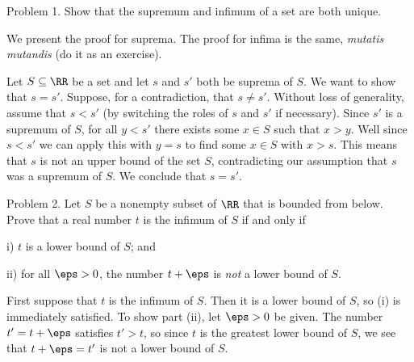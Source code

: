


\def\To{\Rightarrow}


\bigskip

\proclaim Problem 1. Show that the supremum and infimum of a set are both unique.


\proof We present the proof for suprema. The proof for infima is the same, {\it mutatis mutandis}
(do it as an exercise).

Let $S\subseteq \RR$ be a set and let $s$ and $s'$ both be suprema of $S$.
We want to show that $s = s'$.
Suppose, for a contradiction, that $s\ne s'$. Without loss of generality, assume that
$s<s'$ (by switching the roles of $s$ and $s'$ if necessary).
Since $s'$ is a supremum of $S$, for all $y < s'$ there exists some $x\in S$ such that
$x > y$. Well since $s<s'$ we can apply this with $y=s$ to find some
$x\in S$ with $x > s$. This means that $s$ is not an upper bound of the set $S$,
contradicting our assumption that $s$ was a supremum of $S$. We conclude that $s = s'$.\slug

\proclaim Problem 2. Let $S$ be a nonempty subset of $\RR$ that is bounded from below.
Prove that a real number $t$ is the infimum of $S$ if and only if
\medskip
\item{i)} $t$ is a lower bound of $S$; and
\smallskip
\item{ii)} for all $\eps > 0$, the number $t + \eps$ is {\it not} a lower bound of $S$.
\medskip


\proof First suppose that $t$ is the infimum of $S$. Then it is a lower bound of $S$, so (i) is
immediately satisfied. To show part (ii), let $\eps > 0$ be given. The number $t' = t+\eps$
satisfies $t' > t$, so since $t$ is the greatest lower bound of $S$,
we see that $t+\eps = t'$ is not a lower bound of $S$.

